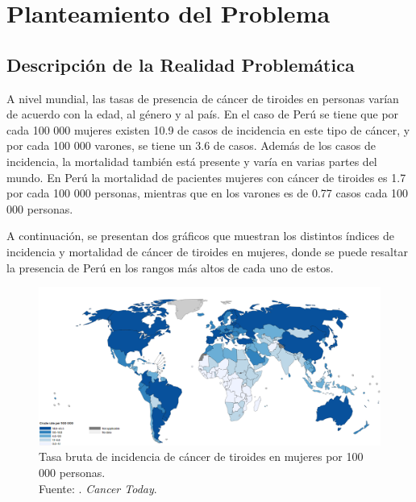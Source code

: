 \chapter{Planteamiento del Problema}
\section{Descripción de la Realidad Problemática}

A nivel mundial, las tasas de presencia de cáncer de tiroides en personas varían de acuerdo con la edad, al género y al país. En el caso de Perú se tiene que por cada 100 000 mujeres existen 10.9 de casos de incidencia en este tipo de cáncer, y por cada 100 000 varones, se tiene un 3.6 de casos. Además de los casos de incidencia, la mortalidad también está presente y varía en varias partes del mundo. En Perú la mortalidad de pacientes mujeres con cáncer de tiroides es 1.7 por cada 100 000 personas, mientras que en los varones es de 0.77 casos cada 100 000 personas. \parencite{ws_oms2022cancert}

A continuación, se presentan dos gráficos que muestran los distintos índices de incidencia y mortalidad de cáncer de tiroides en mujeres, donde se puede resaltar la presencia de Perú en los rangos más altos de cada uno de estos. 

\begin{figure}[H]
	\begin{center}
		\includegraphics[width=1.00 \textwidth]{1/figures/tb_inc_ct_mujeres.png}
		\caption[Tasa bruta de incidencia de cáncer de tiroides en mujeres por 100 000 personas]{Tasa bruta de incidencia de cáncer de tiroides en mujeres por 100 000 personas. \\
		Fuente: \cite{ws_oms2022cancert}. \textit{Cancer Today}.}
		\label{1:fig}
	\end{center}
\end{figure}


